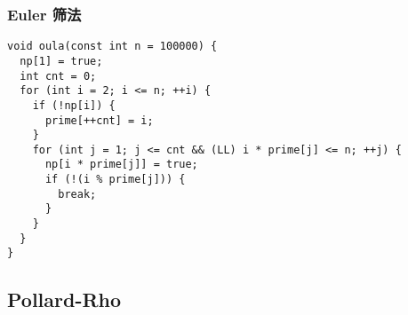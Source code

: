 \documentclass[a4paper,11pt,twoside,fontset = fandol,UTF8]{ctexbook} %
\begin{document}
\subsubsection{Euler 筛法}

\begin{lstlisting}
void oula(const int n = 100000) {
  np[1] = true;
  int cnt = 0;
  for (int i = 2; i <= n; ++i) {
    if (!np[i]) {
      prime[++cnt] = i;
    }
    for (int j = 1; j <= cnt && (LL) i * prime[j] <= n; ++j) {
      np[i * prime[j]] = true;
      if (!(i % prime[j])) {
        break;
      }
    }
  }
}
\end{lstlisting}

\subsection{Pollard-Rho}
\end{document}
